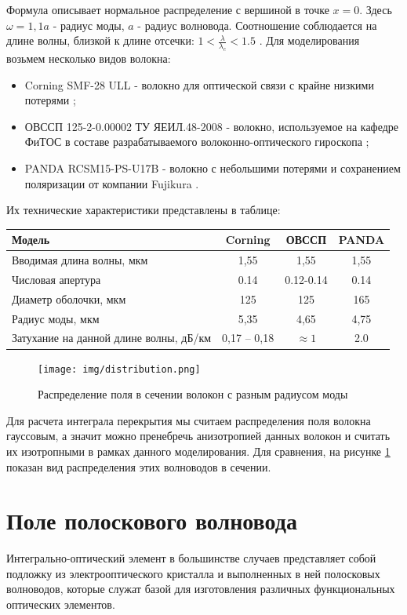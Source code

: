 Формула описывает нормальное распределение с вершиной в точке $x=0$.
Здесь $\omega = 1{,}1a$ - радиус моды, $a$ - радиус волновода. Соотношение соблюдается на длине волны, близкой к длине отсечки: $1 < \frac{\lambda}{\lambda_c} < 1.5$ \cite{lefevre}. Для моделирования возьмем несколько видов волокна:
\begin{itemize}
\item Corning SMF-28 ULL - волокно для оптической связи с крайне низкими потерями \cite{tu_corning};
\item ОВССП 125-2-0.00002 ТУ ЯЕИЛ.48-2008 - волокно, используемое на кафедре ФиТОС в составе разрабатываемого волоконно-оптического гироскопа \cite{tu_fog};
\item PANDA RCSM15-PS-U17B - волокно с небольшими потерями и сохранением поляризации от компании Fujikura \cite{tu_panda}.
\end{itemize}

Их технические характеристики представлены в таблице:
\begin{center}
\begin{tabular}{|p{6cm}|c|c|c|}
\hline
Модель & Corning & ОВССП & PANDA \\
\hline
Вводимая длина волны, мкм & 1,55 & 1,55 & 1,55 \\
\hline
Числовая апертура & 0.14 & 0.12-0.14 & 0.14 \\
\hline
Диаметр оболочки, мкм & 125 & 125 & 165 \\
\hline
Радиус моды, мкм & 5,35 & 4,65 & 4,75 \\
\hline
Затухание на данной длине волны, дБ/км & 0,17 – 0,18 & $\approx 1$ & 2.0 \\
\hline
\end{tabular}
\end{center}

\begin{figure}[h!]
	\texttt{[image: img/distribution.png]}
	\caption{Распределение поля в сечении волокон с разным радиусом моды}
	\label{diameter}
\end{figure}
Для расчета интеграла перекрытия мы считаем распределения поля волокна гауссовым, а значит можно пренебречь анизотропией данных волокон и считать их изотропными в рамках данного моделирования. Для сравнения, на рисунке \ref{diameter} показан вид распределения этих волноводов в сечении.

\section{Поле полоскового волновода}
\label{strip_field}
Интегрально-оптический элемент в большинстве случаев представляет собой подложку из электрооптического кристалла и выполненных в ней полосковых волноводов, которые служат базой для изготовления различных функциональных оптических элементов.

